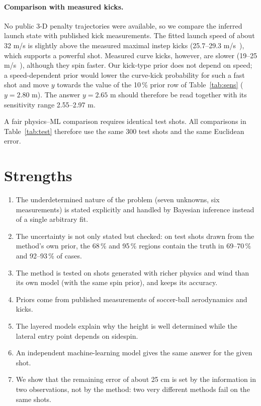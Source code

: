 \documentclass[11pt,a4paper]{article}
\begin{document}
\paragraph{Comparison with measured kicks.} No public 3-D penalty trajectories were available, so we compare the inferred launch state with published kick measurements. The fitted launch speed of about 32 m/s is slightly above the measured maximal instep kicks (25.7--29.3 m/s~\citep{tsukada}), which supports a powerful shot. Measured curve kicks, however, are slower (19--25 m/s~\citep{whiteside,tsukada}), although they spin faster. Our kick-type prior does not depend on speed; a speed-dependent prior would lower the curve-kick probability for such a fast shot and move $y$ towards the value of the 10\,\% prior row of Table~\ref{tab:sens} ($y=2.80$ m). The answer $y=2.65$ m should therefore be read together with its sensitivity range 2.55--2.97 m.

A fair physics--ML comparison requires identical test shots. All comparisons in Table~\ref{tab:test} therefore use the same 300 test shots and the same Euclidean error.

\section{Strengths}
\begin{enumerate}[leftmargin=*]
    \item The underdetermined nature of the problem (seven unknowns, six measurements) is stated explicitly and handled by Bayesian inference instead of a single arbitrary fit.
    \item The uncertainty is not only stated but checked: on test shots drawn from the method's own prior, the 68\,\% and 95\,\% regions contain the truth in 69--70\,\% and 92--93\,\% of cases.
    \item The method is tested on shots generated with richer physics and wind than its own model (with the same spin prior), and keeps its accuracy.
    \item Priors come from published measurements of soccer-ball aerodynamics and kicks.
    \item The layered models explain why the height is well determined while the lateral entry point depends on sidespin.
    \item An independent machine-learning model gives the same answer for the given shot.
    \item We show that the remaining error of about 25 cm is set by the information in two observations, not by the method: two very different methods fail on the same shots.
\end{enumerate}
\end{document}
